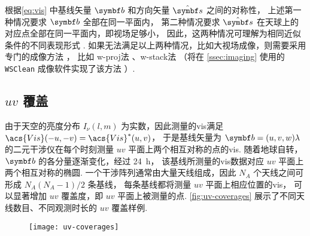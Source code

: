 根据\autoref{eq:vis} 中基线矢量 $\B{b}$ 和方向矢量 $\hat{\B{s}}$ 之间的对称性，
上述第一种情况要求 $\B{b}$ 全部在同一平面内，
第二种情况要求 $\hat{\B{s}}$ 在天球上的对应点全部在同一平面内，即视场足够小，
因此，这两种情况可理解为相同近似条件的不同表现形式 \cite{clark1999}.
如果无法满足以上两种情况，比如大视场成像，则需要采用专门的成像方法
\cite{cornwell1992,sault2007}，
比如 \ac{w-proj}法 \cite{cornwell2008}、\ac{w-stack}法 \cite{humphreys2011}
（将在 \autoref{ssec:imaging} 使用的 \texttt{WSClean} 成像软件实现了该方法
\cite{offringa2014,offringa2017}）.

\subsection{\texorpdfstring{$uv$}{uv} 覆盖}

由于天空的亮度分布 $I_{\nu}(l,m)$ 为实数，因此测量的\ac{vis}满足
$\acs{Vis}(-u,-v) = \acs{Vis}^*(u,v)$，
于是基线矢量为 $\B{b} = (u,v,w)\lambda$ 的二元干涉仪在每个时刻测量
$uv$ 平面上两个相互对称的点的\ac{vis}.
随着地球自转，$\B{b}$ 的各分量逐渐变化，经过 \SI{24}{\hour}，
该基线所测量的\ac{vis}数据对应 $uv$ 平面上两个相互对称的椭圆.
一个干涉阵列通常由大量天线组成，因此 $N_A$ 个天线之间可形成 $N_A(N_A-1)/2$ 条基线，
每条基线都将测量 $uv$ 平面上相应位置的\ac{vis}，
可以显著增加 $uv$ 覆盖度，即 $uv$ 平面上被测量的点.
\autoref{fig:uv-coverages} 展示了不同天线数目、不同观测时长的 $uv$ 覆盖样例.

\begin{figure}[htp]
  \centering
  \texttt{[image: uv-coverages]}
  \label{fig:uv-coverages}
\end{figure}

